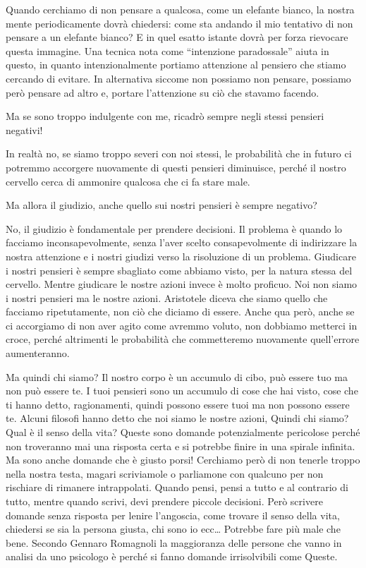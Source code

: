 \documentclass[12pt]{book} %
\begin{document}
Quando cerchiamo di non pensare a qualcosa, come un elefante bianco, la nostra mente periodicamente dovrà chiedersi:
come sta andando il mio tentativo di non pensare a un elefante bianco? E in quel esatto istante dovrà per forza
rievocare questa immagine. Una tecnica nota come “intenzione paradossale” aiuta in questo, in quanto intenzionalmente
portiamo attenzione al pensiero che stiamo cercando di evitare. In alternativa siccome non possiamo non pensare,
possiamo però pensare ad altro e, portare l'attenzione su ciò che stavamo facendo. 

Ma se sono troppo indulgente con me, ricadrò sempre negli stessi pensieri negativi! 

In realtà no, se siamo troppo severi con noi stessi, le probabilità che in futuro ci potremmo accorgere nuovamente di
questi pensieri diminuisce, perché il nostro cervello cerca di ammonire qualcosa che ci fa stare male. 

Ma allora il giudizio, anche quello sui nostri pensieri è sempre negativo?

No, il giudizio è fondamentale per prendere decisioni. Il problema è quando lo facciamo inconsapevolmente, senza
l'aver scelto consapevolmente di indirizzare la nostra attenzione e i nostri giudizi verso la
risoluzione di un problema. Giudicare i nostri pensieri è sempre sbagliato come abbiamo visto, per la natura stessa del
cervello. Mentre giudicare le nostre azioni invece è molto proficuo. Noi non siamo i nostri pensieri ma le nostre
azioni. Aristotele diceva che siamo quello che facciamo ripetutamente, non ciò che diciamo di essere. Anche qua però, anche se ci accorgiamo di non aver agito come avremmo voluto, non dobbiamo metterci in croce, perché altrimenti le probabilità che commetteremo nuovamente quell'errore aumenteranno. 

Ma quindi chi siamo? Il nostro corpo è un accumulo di cibo, può essere tuo ma non può essere te. I tuoi pensieri sono un
accumulo di cose che hai visto, cose che ti hanno detto, ragionamenti, quindi possono essere tuoi ma non possono essere
te. Alcuni filosofi hanno detto che noi siamo le nostre azioni, Quindi chi siamo? Qual è il senso della vita? Queste sono domande
potenzialmente pericolose perché non troveranno mai una risposta certa e si potrebbe finire in una spirale infinita. Ma
sono anche domande che è giusto porsi! Cerchiamo però di non tenerle troppo nella nostra testa, magari scriviamole o
parliamone con qualcuno per non rischiare di rimanere intrappolati. Quando pensi, pensi a tutto e al contrario di tutto, mentre quando scrivi, devi prendere piccole decisioni. Però scrivere domande senza risposta per lenire l'angoscia, come trovare il senso della vita, chiedersi se sia la persona giusta, chi sono io ecc… Potrebbe fare più male che bene. 
Secondo Gennaro Romagnoli la maggioranza delle persone che vanno in analisi da uno psicologo è perché si fanno domande irrisolvibili come Queste.
\end{document}
